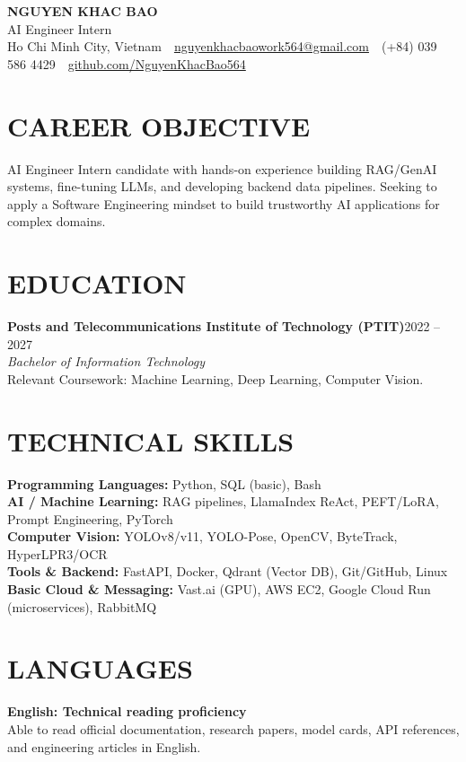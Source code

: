 \documentclass[10pt,a4paper]{article}
\newcommand{\entryhead}[2]{%
    \noindent\textbf{#1}\hfill #2\\[-2pt]
}
\newcommand{\entrysub}[1]{%
    \noindent\textit{#1}\\[-1pt]
}
\begin{document}
\fontsize{9.35}{10.35}\selectfont

\begin{center}
    {\Large\textbf{NGUYEN KHAC BAO}}\\[-1pt]
    AI Engineer Intern\\[2pt]
    Ho Chi Minh City, Vietnam
    \,\textbar\,
    \href{mailto:nguyenkhacbaowork564@gmail.com}{nguyenkhacbaowork564@gmail.com}
    \,\textbar\,
    (+84) 039 586 4429
    \,\textbar\,
    \href{https://github.com/NguyenKhacBao564}{github.com/NguyenKhacBao564}
\end{center}

\section{CAREER OBJECTIVE}
AI Engineer Intern candidate with hands-on experience building RAG/GenAI systems, fine-tuning LLMs, and developing backend data pipelines. Seeking to apply a Software Engineering mindset to build trustworthy AI applications for complex domains.

\section{EDUCATION}
\entryhead{Posts and Telecommunications Institute of Technology (PTIT)}{2022 -- 2027}
\entrysub{Bachelor of Information Technology}
Relevant Coursework: Machine Learning, Deep Learning, Computer Vision.

\section{TECHNICAL SKILLS}
\textbf{Programming Languages:} Python, SQL (basic), Bash\\
\textbf{AI / Machine Learning:} RAG pipelines, LlamaIndex ReAct, PEFT/LoRA, Prompt Engineering, PyTorch\\
\textbf{Computer Vision:} YOLOv8/v11, YOLO-Pose, OpenCV, ByteTrack, HyperLPR3/OCR\\
\textbf{Tools \& Backend:} FastAPI, Docker, Qdrant (Vector DB), Git/GitHub, Linux\\
\textbf{Basic Cloud \& Messaging:} Vast.ai (GPU), AWS EC2, Google Cloud Run (microservices), RabbitMQ

\section{LANGUAGES}
\entryhead{English: Technical reading proficiency}{}
Able to read official documentation, research papers, model cards, API references, and engineering articles in English.
\end{document}
